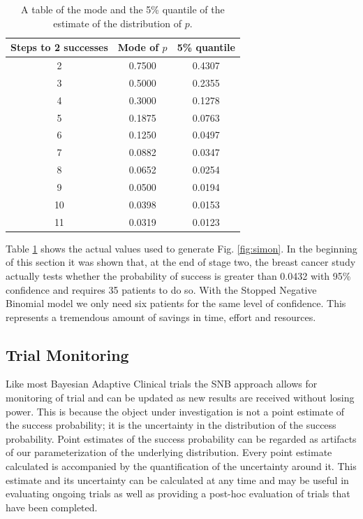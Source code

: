 \documentclass[12pt]{article}         %
\begin{document}
\begin{table}
\begin{center}
\begin{tabular}{|c|c|c|} \hline
{\bf Steps to 2 successes} & {\bf Mode of $p$} & {\bf 5\% quantile} \\ \hline
2 & 0.7500  & 0.4307 \\ \hline
3 & 0.5000  & 0.2355 \\ \hline
4 & 0.3000  & 0.1278 \\ \hline
5 & 0.1875  & 0.0763 \\ \hline
6 & 0.1250  & 0.0497 \\ \hline
7 & 0.0882  & 0.0347 \\ \hline
8 & 0.0652  & 0.0254 \\ \hline
9 & 0.0500  & 0.0194 \\ \hline
10 & 0.0398 & 0.0153 \\ \hline
11 & 0.0319 & 0.0123 \\ \hline
\end{tabular} 
\end{center}
\caption{
A table of the mode and the 5\% quantile of the estimate of the distribution of $p$.
}
\label{tab:simon}
\end{table} 

Table \ref{tab:simon} shows the actual values used to generate Fig. \ref{fig:simon}. In the beginning of this section it was shown that, at the end of stage two, the breast cancer study actually tests whether the probability of success is greater than 0.0432 with 95\% confidence and requires 35 patients to do so. With the Stopped Negative Binomial model we only need six patients for the same level of confidence. This represents a tremendous amount of savings in time, effort and resources.

\subsection{Trial Monitoring}

Like most Bayesian Adaptive Clinical trials the SNB approach allows for monitoring of trial and can be updated as new results are received without losing 
power. This is because the object under investigation is not a point estimate 
of the success probability; it is the uncertainty in the distribution of the 
success probability. Point estimates of the success probability can be 
regarded as artifacts of our parameterization of the underlying distribution. 
Every point estimate calculated is accompanied by the quantification of the 
uncertainty around it. This estimate and its uncertainty can be calculated at 
any time and may be useful in evaluating ongoing trials as well as providing a 
post-hoc evaluation of trials that have been completed.
\end{document}
